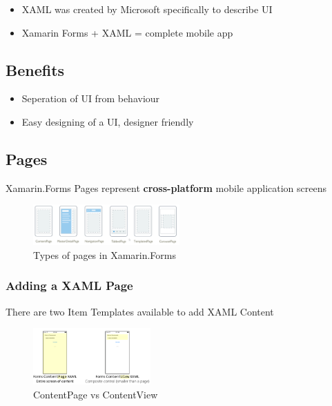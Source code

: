 \documentclass{article}
\newcommand{\bold}[1]{\textbf{#1}}
\begin{document}
\begin{itemize}
    \item XAML was created by Microsoft specifically to describe UI
    \item Xamarin Forms + XAML = complete mobile app
\end{itemize}

\subsection{Benefits}

\begin{itemize}
    \item Seperation of UI from behaviour
    \item Easy designing of a UI, designer friendly
\end{itemize}

\subsection{Pages}

Xamarin.Forms Pages represent \bold{cross-platform} mobile application screens

\begin{figure}[H]
    \centering
    \includegraphics[width=0.5\textwidth]{xaml-page.png}
    \caption{Types of pages in Xamarin.Forms}
\end{figure}

\subsubsection{Adding a XAML Page}

There are two Item Templates available to add XAML Content

\begin{figure}[H]
    \centering
    \includegraphics[width=0.4\textwidth]{contentpage-view.png}
    \caption{ContentPage vs ContentView}
\end{figure}
\end{document}
